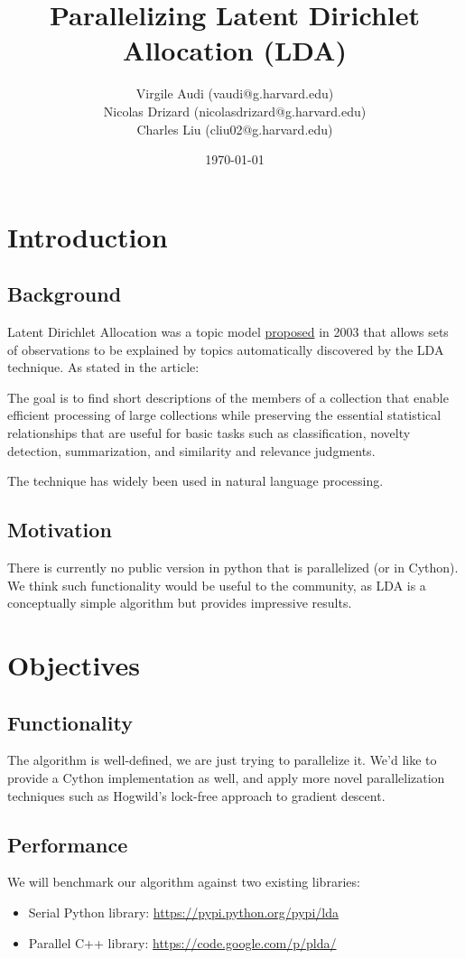 \documentclass{article}
\title{Parallelizing Latent Dirichlet Allocation (LDA)}
\author{Virgile Audi (vaudi@g.harvard.edu)\\ 
		Nicolas Drizard (nicolasdrizard@g.harvard.edu)\\
		Charles Liu (cliu02@g.harvard.edu)}
\date{\today}
\begin{document}
 
\maketitle
 
\section{Introduction}
	\subsection{Background}
		Latent Dirichlet Allocation was a topic model \href{https://www.cs.princeton.edu/~blei/papers/BleiNgJordan2003.pdf}{proposed} in 2003 that allows sets of observations to be explained by topics automatically discovered by the LDA technique. As stated in the article:

		\begin{displayquote}
			The goal is to find short descriptions of the members of a collection that enable efficient
			processing of large collections while preserving the essential statistical relationships that are useful
			for basic tasks such as classification, novelty detection, summarization, and similarity and relevance
			judgments.
		\end{displayquote}

		The technique has widely been used in natural language processing.

	\subsection{Motivation}
		There is currently no public version in python that is parallelized (or in Cython). We think such functionality would be useful to the community, as LDA is a conceptually simple algorithm but provides impressive results.
 
\section{Objectives}
	\subsection{Functionality}
		The algorithm is well-defined, we are just trying to parallelize it. We'd like to provide a Cython implementation as well, and apply more novel parallelization techniques such as Hogwild's lock-free approach to gradient descent.

	\subsection{Performance}
		We will benchmark our algorithm against two existing libraries:
		\begin{itemize}
			\item Serial Python library: \url{https://pypi.python.org/pypi/lda}
			\item Parallel C++ library: \url{https://code.google.com/p/plda/}
		\end{itemize}
\end{document}
